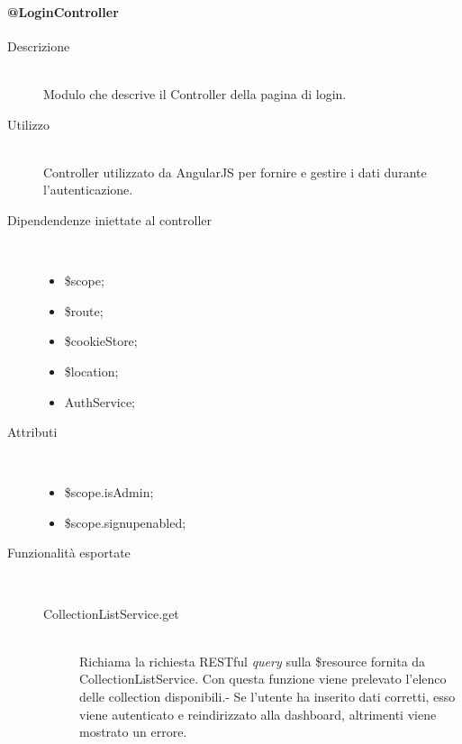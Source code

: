 \paragraph{@LoginController}
\begin{description}
 \item[Descrizione] \hfill \\
 Modulo che descrive il Controller della pagina di login.
 
 \item[Utilizzo] \hfill \\
 Controller utilizzato da AngularJS per fornire e gestire i dati durante l'autenticazione.
 
 \item[Dipendendenze iniettate al controller] \hfill \\
 \begin{itemize}
  \item \$scope;
  \item \$route;
  \item \$cookieStore;
  \item \$location;
  \item AuthService;
  
 \end{itemize}
 
 \item[Attributi] \hfill \\
 \begin{itemize}
 \item  \$scope.isAdmin;
 \item \$scope.signup\textunderscore enabled;
 \end{itemize}
 
 \item[Funzionalità esportate] \hfill \\
 \begin{description}
  \item[ CollectionListService.get] \hfill \\
  Richiama la richiesta RESTful \textit{query} sulla \$resource fornita da CollectionListService.
  Con questa funzione viene prelevato l'elenco delle collection disponibili.-
  Se l'utente ha inserito dati corretti, esso viene autenticato e reindirizzato alla dashboard, altrimenti viene mostrato un errore.
 
  
 \end{description}
\end{description}

